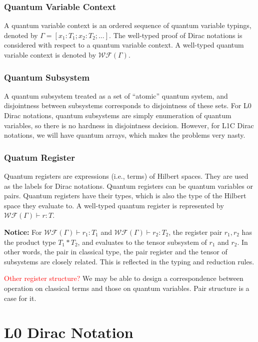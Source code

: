 \subsubsection*{Quantum Variable Context}
A quantum variable context is an ordered sequence of quantum variable typings, denoted by $\Gamma = [x_1 : T_1; x_2 : T_2; \dots]$. The well-typed proof of Dirac notations is considered with respect to a quantum variable context. A well-typed quantum variable context is denoted by $\mathcal{WF}(\Gamma)$.

\subsubsection*{Quantum Subsystem}
A quantum subsystem treated as a set of ``atomic'' quantum system, and disjointness between subsystems corresponds to disjointness of these sets. For L0 Dirac notations, quantum subsystems are simply enumeration of quantum variables, so there is no hardness in disjointness decision. However, for L1C Dirac notations, we will have quantum arrays, which makes the problems very nasty.

\subsubsection*{Quatum Register}
Quantum registers are expressions (i.e., terms) of Hilbert spaces. They are used as the labels for Dirac notations. Quantum registers can be quantum variables or pairs. Quantum registers have their types, which is also the type of the Hilbert space they evaluate to. A well-typed quantum register is represented by $\mathcal{WF}(\Gamma) \vdash r : T$.

\textbf{Notice:} For $\mathcal{WF}(\Gamma) \vdash r_1 : T_1$ and $\mathcal{WF}(\Gamma) \vdash r_2 : T_2$, the register pair $r_1, r_2$ has the product type $T_1 * T_2$, and evaluates to the tensor subsystem of $r_1$ and $r_2$. In other words, the pair in classical type, the pair register and the tensor of subsystems are closely related. This is reflected in the typing and reduction rules.

\textcolor{red}{Other register structure?}
We may be able to design a correspondence between operation on classical terms and those on quantum variables. Pair structure is a case for it.


\section{L0 Dirac Notation}

